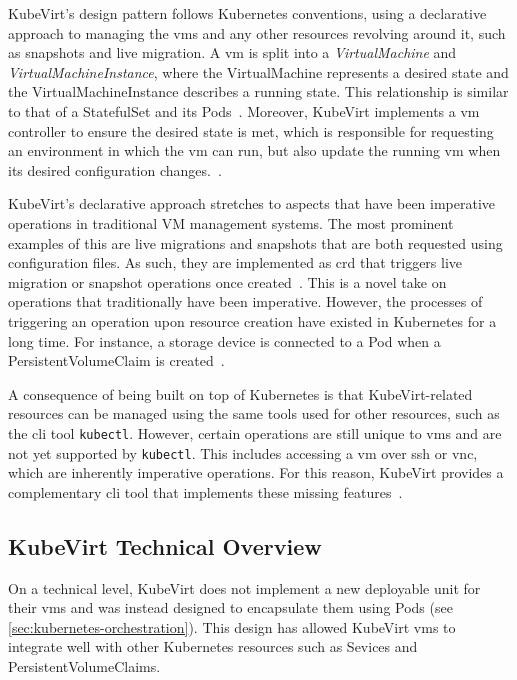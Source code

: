 \documentclass{kththesis}
\begin{document}
KubeVirt's design pattern follows Kubernetes conventions, using a declarative approach to managing the \Glspl{vm} and any other resources revolving around it, such as snapshots and live migration. A \Gls{vm} is split into a \textit{VirtualMachine} and \textit{VirtualMachineInstance}, where the VirtualMachine represents a desired state and the VirtualMachineInstance describes a running state. This relationship is similar to that of a StatefulSet and its Pods\ \cite{kubevirt-vmi}. Moreover, KubeVirt implements a \Gls{vm} controller to ensure the desired state is met, which is responsible for requesting an environment in which the \Gls{vm} can run, but also update the running \Gls{vm} when its desired configuration changes.\ \cite{k8s-docs-kubevirt, kubevirt-architecture}.

KubeVirt's declarative approach stretches to aspects that have been imperative operations in traditional VM management systems. The most prominent examples of this are live migrations and snapshots that are both requested using configuration files. As such, they are implemented as \Gls{crd} that triggers live migration or snapshot operations once created\ \cite{kubevirt-snapshot,kubevirt-live-migration}. This is a novel take on operations that traditionally have been imperative. However, the processes of triggering an operation upon resource creation have existed in Kubernetes for a long time. For instance, a storage device is connected to a Pod when a PersistentVolumeClaim is created\ \cite{k8s-persistent-volumes}.

A consequence of being built on top of Kubernetes is that KubeVirt-related resources can be managed using the same tools used for other resources, such as the \Gls{cli} tool \texttt{kubectl}. However, certain operations are still unique to \Glspl{vm} and are not yet supported by \texttt{kubectl}. This includes accessing a \Gls{vm} over \Gls{ssh} or \Gls{vnc}, which are inherently imperative operations. For this reason, KubeVirt provides a complementary \Gls{cli} tool that implements these missing features\ \cite{kubevirt-virtctl}.

\subsection{KubeVirt Technical Overview}
\label{sec:kubevirt-technical-overview}
On a technical level, KubeVirt does not implement a new deployable unit for their \Glspl{vm} and was instead designed to encapsulate them using Pods (see \ref{sec:kubernetes-orchestration}). This design has allowed KubeVirt \Glspl{vm} to integrate well with other Kubernetes resources such as Sevices and PersistentVolumeClaims. 
\end{document}
